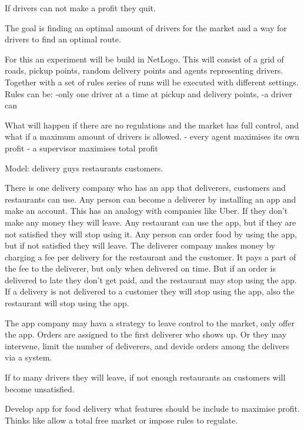 If drivers can not make a profit they quit.

The goal is finding an optimal amount of drivers for the market and a way for drivers to find an optimal route.

For this an experiment will be build in NetLogo.
This will consist of a grid of roads, pickup points, random delivery points and agents representing drivers.
Together with a set of rules series of runs will be executed with different settings.
Rules can be:
-only one driver at a time at pickup and delivery points,
-a driver can

What will happen if there are no regulations and the market has full control, and what if a maximum amount of drivers is allowed.
- every agent maximises its own profit
- a supervisor maximises total profit

Model:
delivery guys
restaurants
customers.

There is one delivery company who has an app that deliverers, customers and restaurants can use.
Any person can become a deliverer by installing an app and make an account.
This has an analogy with companies like Uber.
If they don't make any money they will leave.
Any restaurant can use the app, but if they are not satisfied they will stop using it.
Any person can order food by using the app, but if not satisfied they will leave.
The deliverer company makes money by charging a fee per delivery for the restaurant and the customer.
It pays a part of the fee to the deliverer, but only when delivered on time.
But if an order is delivered to late they don't get paid, and the restaurant may stop using the app.
If a delivery is not delivered to a customer they will stop using the app, also the restaurant will stop using the app.

The app company may hava a strategy to leave control to the market, only offer the app.
Orders are assigned to the first deliverer who shows up.
Or they may intervene, limit the number of deliverers, and devide orders among the delivers via a system.







If to many drivers they will leave, if not enough restaurants an customers will become unsatisfied.



Develop app for food delivery what features should be include to maximise profit.
Thinks like allow a total free market or impose rules to regulate.



